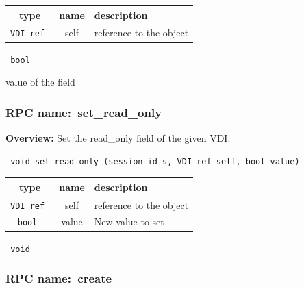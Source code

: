  
\vspace{0.3cm}
\begin{tabular}{|c|c|p{7cm}|}
 \hline
{\bf type} & {\bf name} & {\bf description} \\ \hline
{\tt VDI ref } & self & reference to the object \\ \hline 

\end{tabular}

\vspace{0.3cm}

{\tt 
bool
}


value of the field
\vspace{0.3cm}
\vspace{0.3cm}
\vspace{0.3cm}
\subsubsection{RPC name:~set\_read\_only}

{\bf Overview:} 
Set the read\_only field of the given VDI.

\begin{verbatim} void set_read_only (session_id s, VDI ref self, bool value)\end{verbatim}



 
\vspace{0.3cm}
\begin{tabular}{|c|c|p{7cm}|}
 \hline
{\bf type} & {\bf name} & {\bf description} \\ \hline
{\tt VDI ref } & self & reference to the object \\ \hline 

{\tt bool } & value & New value to set \\ \hline 

\end{tabular}

\vspace{0.3cm}

{\tt 
void
}



\vspace{0.3cm}
\vspace{0.3cm}
\vspace{0.3cm}
\subsubsection{RPC name:~create}

